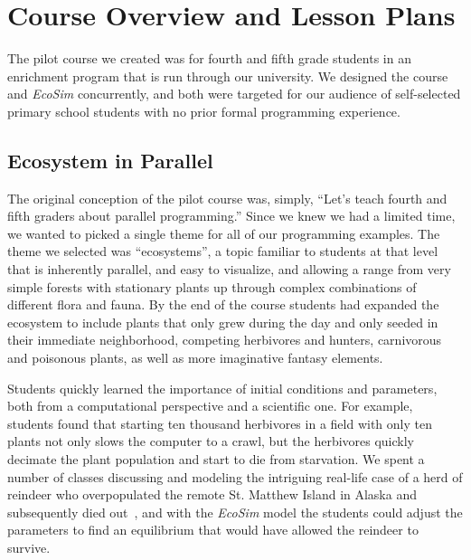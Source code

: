 \documentclass{sig-alternate}
\begin{document}
\section{Course Overview and Lesson Plans}
The pilot course we created was for fourth and fifth grade students in an enrichment program
that is run through our university.  We designed the course and \emph{EcoSim} concurrently,
and both were targeted for our audience of self-selected primary school students with no
prior formal programming experience.

\subsection{Ecosystem in Parallel}
The original conception of the pilot course was, simply, 
``Let's teach fourth and fifth graders about parallel programming.''
Since we knew we had a limited time, we wanted to picked a single theme for all of our programming examples.
The theme we selected was ``ecosystems'', a topic familiar to students at that level
that is inherently parallel, and easy to visualize, 
and allowing a range from very simple forests with stationary plants 
up through complex combinations of different flora and fauna.
By the end of the course students had expanded the ecosystem 
to include plants that only grew during the day and only seeded in their immediate neighborhood,
competing herbivores and hunters, carnivorous and poisonous plants,
as well as more imaginative fantasy elements.

Students quickly learned the importance of initial conditions and parameters, both from a 
computational perspective and a scientific one.  For example, students found that starting 
ten thousand herbivores in a field with only ten plants
not only slows the computer to a crawl, but the herbivores quickly decimate the plant population
and start to die from starvation.  We spent a number of classes discussing and
modeling the intriguing real-life case of a herd of reindeer who overpopulated the remote
St. Matthew Island in Alaska and subsequently died out~\cite{klein1968introduction,stMatthewIsland}, 
and with the \emph{EcoSim} model the students could adjust the parameters to find an
equilibrium that would have allowed the reindeer to survive.
\end{document}
